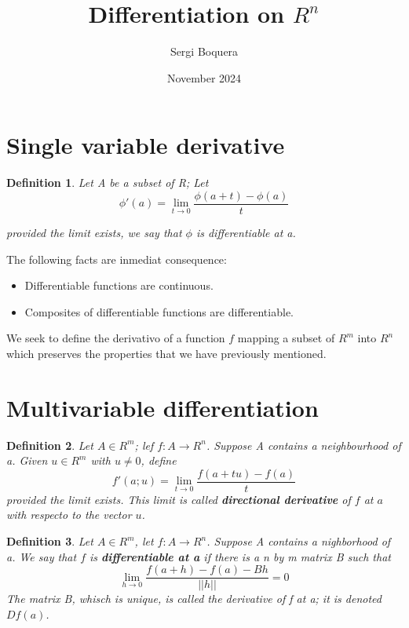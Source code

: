 \documentclass[12pt, letterpaper]{article}
\title{Differentiation on $R^n$}
\author{Sergi Boquera}
\date{November 2024}
\newtheorem{definition}{Definition}[section]
\begin{document}
	\maketitle
	
	
	
	
	\section{Single variable derivative}
	
	\begin{definition}
		Let A be a subset of R; Let 
		\[ \phi'(a) = \lim_{t\to0} \frac{\phi(a+t) - \phi(a)}{t} \]
		
		provided the limit exists, we say that $\phi$ is differentiable at a.
	\end{definition}
	
	 The following facts are inmediat consequence:
	\begin{itemize}
		\item Differentiable functions are continuous.
		\item Composites of differentiable functions are differentiable.
	\end{itemize}
	We seek to define the derivativo of a function $f$ mapping a subset of $R^m$ into $R^n$ which preserves the properties that we have previously mentioned.\newline
	
	
	
	
	\section{Multivariable differentiation}
	
		\begin{definition}
			Let $A \in R^m$; lef $f: A \to R^n $. Suppose A contains a neighbourhood of a. Given $u \in R^m$ with $u \ne 0$, define
				\[f'(a;u) = \lim_{t \to 0}\frac{f(a+tu)-f(a)}{t}\]
			provided the limit exists. This limit is called \textbf{directional derivative} of $f$ at $a$ with respecto to the vector $u$.\newline
		\end{definition}
		
	
		\begin{definition}
			Let $A \in R^m$, let $f: A \to R^n$. Suppose A contains a nighborhood of a. We say that $f$ is \textbf{differentiable at a} if there is a n by m matrix B such that
				\[ \lim_{h \to 0} \frac{f(a+h) - f(a) - Bh}{||h||} = 0\]
			The matrix B, whisch is unique, is called the derivative of f at a; it is denoted $Df(a)$.\newline
		\end{definition}
		
\end{document}
